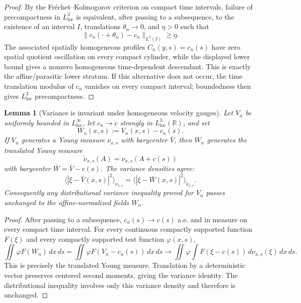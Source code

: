 \documentclass[11pt]{amsart}
\numberwithin{equation}{section}
\theoremstyle{plain}
\newtheorem{lemma}[theorem]{Lemma}
\theoremstyle{definition}
\theoremstyle{remark}
\newcommand{\loc}{\mathrm{loc}}
\begin{document}
\begin{proof}
By the Fr\'echet--Kolmogorov criterion on compact time intervals, failure of
precompactness in \(L^3_{\loc}\) is equivalent, after passing to a subsequence,
to the existence of an interval \(I\), translations \(\theta_n\to0\), and
\(\eta>0\) such that
\[
   \|c_n(\cdot+\theta_n)-c_n\|_{L^3(I)}\ge\eta .
\]
The associated spatially homogeneous profiles \(C_n(y,s)=c_n(s)\) have zero
spatial quotient oscillation on every compact cylinder, while the displayed
lower bound gives a nonzero homogeneous time-dependent descendant.
This is exactly the affine/parasitic lower stratum.  If this alternative does
not occur, the time translation modulus of \(c_n\) vanishes on every compact
interval; boundedness then gives \(L^3_{\loc}\) precompactness.
\end{proof}

\begin{lemma}[Variance is invariant under homogeneous velocity gauges]
\label{lem:variance-homogeneous-shift}
Let \(V_n\) be uniformly bounded in \(L^\infty_{\loc}\), let
\(c_n\to c\) strongly in \(L^3_{\loc}(\mathbb R)\), and set
\[
   W_n(x,s):=V_n(x,s)-c_n(s).
\]
If \(V_n\) generates a Young measure \(\nu_{x,s}\) with barycenter
\(\bar V\), then \(W_n\) generates the translated Young measure
\[
   \widetilde\nu_{x,s}(A)=\nu_{x,s}(A+c(s))
\]
with barycenter \(\bar W=\bar V-c(s)\).  The variance densities agree:
\[
   \langle|\xi-\bar V(x,s)|^2\rangle_{\nu_{x,s}}
   =
   \langle|\xi-\bar W(x,s)|^2\rangle_{\widetilde\nu_{x,s}} .
\]
Consequently any distributional variance inequality proved for \(V_n\) passes
unchanged to the affine-normalized fields \(W_n\).
\end{lemma}

\begin{proof}
After passing to a subsequence, \(c_n(s)\to c(s)\) a.e. and in measure on every
compact time interval.  For every continuous compactly supported function
\(F(\xi)\) and every compactly supported test function \(\varphi(x,s)\),
\[
   \iint \varphi F(W_n)\,dx\,ds
   =
   \iint \varphi F(V_n-c_n(s))\,dx\,ds
   \to
   \iint\varphi\int F(\xi-c(s))\,d\nu_{x,s}(\xi)\,dx\,ds .
\]
This is precisely the translated Young measure.  Translation by a deterministic
vector preserves centered second moments, giving the variance identity.  The
distributional inequality involves only this variance density and therefore is
unchanged.
\end{proof}
\end{document}
